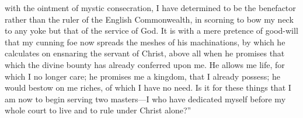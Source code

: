 \documentclass[10pt]{book}
\begin{document}
\vspace{-2\parskip}
\vspace{-3\lineskip}
with the ointment of mystic consecration, I have determined to be the benefactor rather than the ruler of the English Commonwealth, in scorning to bow my neck to any yoke but that of the service of God. It is with a mere pretence of good-will that my cunning foe now spreads the meshes of his machinations, by which he calculates on ensnaring the servant of Christ, above all when he promises that which the divine bounty has already conferred upon me. He allows me life, for which I no longer care; he promises me a kingdom, that I already possess; he would bestow on me riches, of which I have no need. Is it for these things that I am now to begin serving two masters---I who have dedicated myself before my whole court to live and to rule under Christ alone?''
\end{document}
